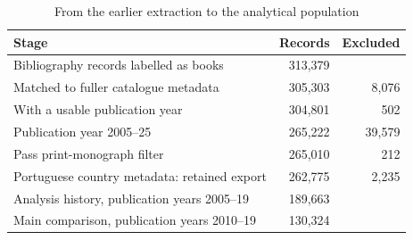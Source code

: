 \begin{table}[htbp]\centering\small
\caption{From the earlier extraction to the analytical population}\label{tab:population}
\begin{tabular}{p{.64\linewidth}rr}\toprule
Stage & Records & Excluded\\\midrule
Bibliography records labelled as books & 313,379 & \\
Matched to fuller catalogue metadata & 305,303 & 8,076\\
With a usable publication year & 304,801 & 502\\
Publication year 2005--25 & 265,222 & 39,579\\
Pass print-monograph filter & 265,010 & 212\\
Portuguese country metadata: retained export & 262,775 & 2,235\\
Analysis history, publication years 2005--19 & 189,663 & \\
Main comparison, publication years 2010--19 & 130,324 & \\
\bottomrule\end{tabular}
\end{table}
